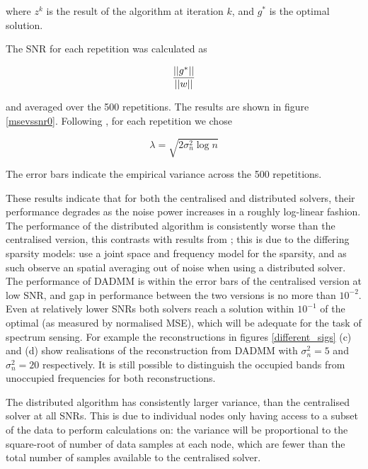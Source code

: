 where \(z^k\) is the result of the algorithm at iteration \(k\), and \(g^*\) is the optimal solution.

The SNR for each repetition was calculated as

\begin{equation}
\frac{\left|\left|g^*\right|\right|}{\left|\left|w\right|\right|}
\end{equation}

and averaged over the 500 repetitions. The results are shown in figure \eqref{msevssnr0}. Following \cite{Chen1998}, for each repetition we chose 

\begin{equation}
\lambda = \sqrt{2\sigma^2_n\log{n}}
\end{equation}

The error bars indicate the empirical variance across the 500 repetitions.

These results indicate that for both the centralised and distributed solvers, their performance degrades as the noise power increases in a roughly log-linear fashion. The performance of the distributed algorithm is consistently worse than the centralised version, this contrasts with results from \cite{bazerque2008}; this is due to the differing sparsity models: \cite{bazerque2008} use a joint space and frequency model for the sparsity, and as such observe an spatial averaging out of noise when using a distributed solver. The performance of DADMM is within the error bars of the centralised version at low SNR, and gap in performance between the two versions is no more than \(10^{-2}\). Even at relatively lower SNRs both solvers reach a solution within \(10^{-1}\) of the optimal (as measured by normalised MSE), which will be adequate for the task of spectrum sensing. For example the reconstructions in figures \eqref{different_sigs} (c) and (d) show realisations of the reconstruction from DADMM with \(\sigma^2_n = 5\) and \(\sigma^2_n = 20\) respectively. It is still possible to distinguish the occupied bands from unoccupied frequencies for both reconstructions.

The distributed algorithm has consistently larger variance, than the centralised solver at all SNRs. This is due to individual nodes only having access to a subset of the data to perform calculations on: the variance will be proportional to the square-root of number of data samples at each node, which are fewer than the total number of samples available to the centralised solver. 

